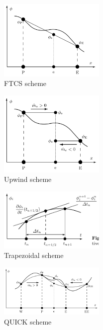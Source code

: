 \documentclass[twocolumn,10pt]{asme2ej}
\begin{document}
\begin{figure}[thb]
\begin{center}
\includegraphics[width=0.45\textwidth]{figure/FTCS.png}
\caption{FTCS scheme}
\label{FTCS_scheme}
\end{center}
\end{figure}

\begin{figure}[thb]
\begin{center}
\includegraphics[width=0.45\textwidth]{figure/Upwind.png}
\caption{Upwind scheme}
\label{Upwind_scheme}
\end{center}
\end{figure}

\begin{figure}[thb]
\begin{center}
\includegraphics[width=0.45\textwidth]{figure/Trapezoidal (time derivative).png}
\caption{Trapezoidal scheme}
\label{Trapezoidal_scheme}
\end{center}
\end{figure}

\begin{figure}[thb]
\begin{center}
\includegraphics[width=0.45\textwidth]{figure/QUICK.png}
\caption{QUICK scheme}
\label{QUICK_scheme}
\end{center}
\end{figure}
\end{document}
